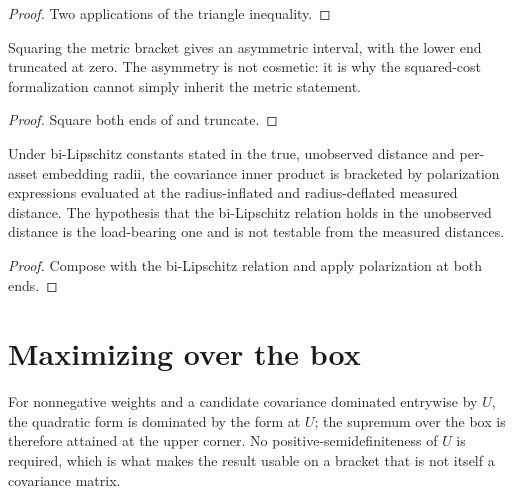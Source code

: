 \begin{proof}
  Two applications of the triangle inequality.
\end{proof}

\begin{theorem}
  \label{thm:energy-bracket}
  Squaring the metric bracket gives an asymmetric interval, with the lower end
  truncated at zero.
  The asymmetry is not cosmetic: it is why the squared-cost formalization cannot
  simply inherit the metric statement.
\end{theorem}

\begin{proof}
  Square both ends of  and truncate.
\end{proof}

\begin{theorem}
  \label{thm:covariance-bracket}
  Under bi-Lipschitz constants stated in the true, unobserved distance and
  per-asset embedding radii, the covariance inner product is bracketed by
  polarization expressions evaluated at the radius-inflated and radius-deflated
  measured distance.
  The hypothesis that the bi-Lipschitz relation holds in the unobserved distance
  is the load-bearing one and is not testable from the measured distances.
\end{theorem}

\begin{proof}
  Compose  with the bi-Lipschitz relation and apply
  polarization at both ends.
\end{proof}

\section{Maximizing over the box}

\begin{theorem}
  \label{thm:box-corner}
  \notready
  For nonnegative weights and a candidate covariance dominated entrywise by
  \(U\), the quadratic form is dominated by the form at \(U\); the supremum over
  the box is therefore attained at the upper corner.
  No positive-semidefiniteness of \(U\) is required, which is what makes the
  result usable on a bracket that is not itself a covariance matrix.
\end{theorem}

